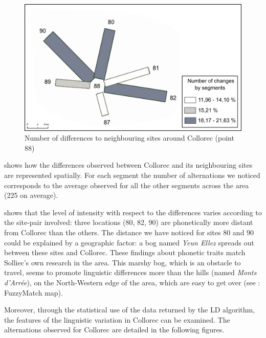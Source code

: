 \documentclass[output=paper]{LSP/langsci}
\begin{document}
\begin{figure}
\includegraphics[width=\textwidth]{illustrations/brun_etal_fig7}
\caption{Number of differences to neighbouring sites around Collorec (point 88)}
\label{fig:7}
\end{figure}

 shows how the differences observed between Collorec and its neighbouring sites are represented spatially. For each segment the number of alternations we noticed corresponds to the average observed for all the other segments across the area (225 on average).

 shows that the level of intensity with respect to the differences varies according to the site-pair involved: three locations (80, 82, 90) are phonetically more distant from Collorec than the others. The distance we have noticed for sites 80 and 90 could be explained by a geographic factor: a bog named \textit{Yeun Ellez} spreads out between these sites and Collorec. These findings about phonetic traits match Solliec's own research in the area. This marshy bog, which is an obstacle to travel, seems to promote linguistic differences more than the hills (named \textit{Monts d'Arrée}), on the North-Western edge of the area, which are easy to get over (see : FuzzyMatch map).

Moreover, through the statistical use of the data returned by the LD algorithm, the features of the linguistic variation in Collorec can be examined. The alternations observed for Collorec are detailed in the following figures.
\end{document}
